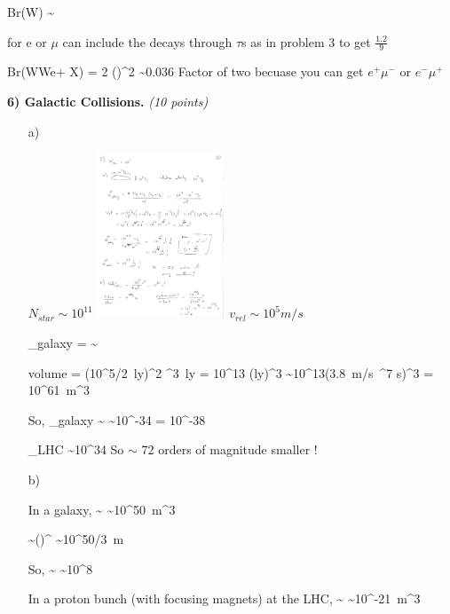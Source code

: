 {\be
Br(W\rightarrow \ell \nu) \sim {} 
\ee

for e or $\mu$ can include the decays through $\tau$s as in problem 3 to get $\frac{1.2}{9}$

\be
Br(WW\rightarrow e\mu + X) = 2 \times \left(\right)^2 \sim 0.036
\ee
Factor of two becuase you can get $e^+\mu^-$ or $e^-\mu^+$


\textbf{6) Galactic Collisions.} \hfill \textit{(10 points)}\\
\begin{itemize}
\item[a)] { 
$N_{star} \sim 10^{11}$\hspace*{0.5in}
\includegraphics[width=0.3\textwidth]{./Galaxy.pdf}\hspace*{0.5in}
$v_{rel} \sim 10^5 m/s$

\be
{}_{galaxy} =  \sim {}
\ee

\be
volume = \pi (10^5/2\ ly)^2 ^3\ ly =  10^{13} (ly)^3 \sim 10^{13}(3.8\ m/s\ ^7 s)^3 = 10^{61}\ m^3
\ee

So,
\be
{}_{galaxy}  \sim {} \sim 10^{-34}  = 10^{-38}  
\ee

\be
{}_{LHC}  \sim 10^{34}  
\ee
So $\sim$ 72 orders of magnitude smaller !


}
\item[b)] {
In a galaxy,
\be
{} \sim {} \sim 10^{50}\ m^3
\ee


\be
{} \sim \left(\right)^{} \sim 10^{50/3}\ m
\ee

So, 
\be
{} \sim {} \sim 10^8
\ee

In a proton bunch (with focusing magnets)  at the LHC, 
\be
{} \sim {} \sim 10^{-21}\ m^3
\ee

}
\end{itemize}}
